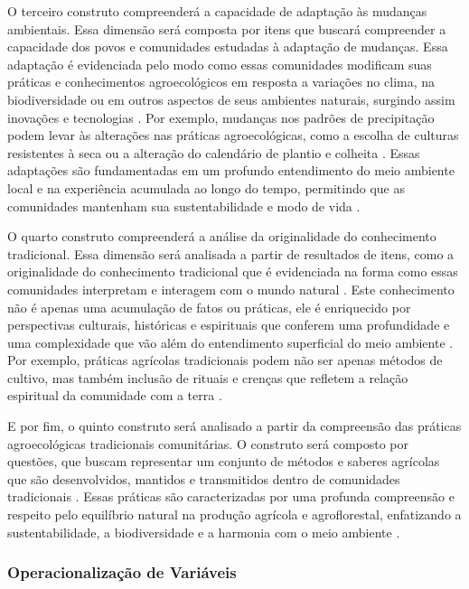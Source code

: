 O terceiro construto compreenderá a capacidade de adaptação às mudanças ambientais. Essa dimensão será composta por itens que buscará compreender a capacidade dos povos e comunidades estudadas à adaptação de mudanças. Essa adaptação é evidenciada pelo modo como essas comunidades modificam suas práticas e conhecimentos agroecológicos em resposta a variações no clima, na biodiversidade ou em outros aspectos de seus ambientes naturais, surgindo assim inovações e tecnologias \cite{Zhong2022}. 
Por exemplo, mudanças nos padrões de precipitação podem levar às alterações nas práticas agroecológicas, como a escolha de culturas resistentes à seca ou a alteração do calendário de plantio e colheita \cite{Verma2019}. Essas adaptações são fundamentadas em um profundo entendimento do meio ambiente local e na experiência acumulada ao longo do tempo, permitindo que as comunidades mantenham sua sustentabilidade e modo de vida \cite{Kline2018}.

O quarto construto compreenderá a análise da originalidade do conhecimento tradicional. Essa dimensão será analisada a partir de resultados de itens, como a originalidade do conhecimento tradicional que é evidenciada na forma como essas comunidades interpretam e interagem com o mundo natural \cite{Kawecki2004}.
Este conhecimento não é apenas uma acumulação de fatos ou práticas, ele é enriquecido por perspectivas culturais, históricas e espirituais que conferem uma profundidade e uma complexidade que vão além do entendimento superficial do meio ambiente \cite{DAmbrosio2015}. Por exemplo, práticas agrícolas tradicionais podem não ser apenas métodos de cultivo, mas também inclusão de rituais e crenças que refletem a relação espiritual da comunidade com a terra \cite{Souravi2019}.

E por fim, o quinto construto será analisado a partir da compreensão das práticas agroecológicas tradicionais comunitárias. O construto será composto por questões, que buscam representar um conjunto de métodos e saberes agrícolas que são desenvolvidos, mantidos e transmitidos dentro de comunidades tradicionais \cite{Altieri2019}. Essas práticas são caracterizadas por uma profunda compreensão e respeito pelo equilíbrio natural na produção agrícola e agroflorestal, enfatizando a sustentabilidade, a biodiversidade e a harmonia com o meio ambiente \cite{Irhza2023}.


\subsubsection{Operacionalização de Variáveis}

